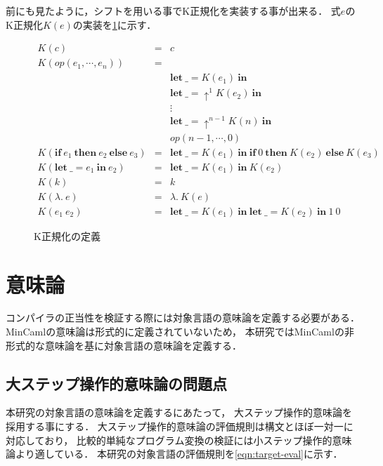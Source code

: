 \documentclass{sumiilab-paper}
\newcommand{\keyword}[1]{\mathbf{#1}}
\newcommand{\IF}{\keyword{if}}
\newcommand{\THEN}{\keyword{then}}
\newcommand{\ELSE}{\keyword{else}}
\newcommand{\LET}{\keyword{let}}
\newcommand{\IN}{\keyword{in}}
\begin{document}
前にも見たように，シフトを用いる事でK正規化を実装する事が出来る．
式$e$のK正規化$K(e)$の実装を\figurename\ref{eqn:target-knormal}に示す．
\begin{figure}[htbp]
	\[ \begin{array}{lll}
			K(c) & = & c \\
			K(\textit{op} (e_1, \cdots , e_n)) & = & \\
																					& & \LET~\_=K(e_1)~\IN \\
																 & & \LET~\_=\uparrow^1 K(e_2)~\IN \\
													 & & \vdots \\
											& & \LET~\_=\uparrow^{n-1}K(n)~\IN \\
											& & \textit{op} (n-1, \cdots, 0) \\
			K(\IF~e_1~\THEN~e_2~\ELSE~e_3) & = & \LET~\_=K(e_1)~\IN~\IF~0~\THEN~K(e_2)~\ELSE~K(e_3) \\
			K(\LET~\_=e_1~\IN~e_2) & = & \LET~\_=K(e_1)~\IN~K(e_2) \\
			K(k) & = & k \\
			K(\lambda.~e) & = & \lambda.~K(e) \\
			K(e_1~e_2) & = & \LET~\_=K(e_1)~\IN~\LET~\_=K(e_2)~\IN~1~0
	\end{array} \]
	\caption{K正規化の定義}
	\label{eqn:target-knormal}
\end{figure}

\chapter{意味論}\label{chapter:semantics}
コンパイラの正当性を検証する際には対象言語の意味論を定義する必要がある．
MinCamlの意味論は形式的に定義されていないため，
本研究ではMinCamlの非形式的な意味論を基に対象言語の意味論を定義する．

\section{大ステップ操作的意味論の問題点}
本研究の対象言語の意味論を定義するにあたって，
大ステップ操作的意味論を採用する事にする．
大ステップ操作的意味論の評価規則は構文とほぼ一対一に対応しており，
比較的単純なプログラム変換の検証には小ステップ操作的意味論より適している．
本研究の対象言語の評価規則を\figurename\ref{eqn:target-eval}に示す．
\end{document}
